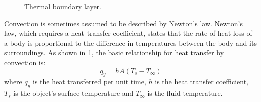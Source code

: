     \begin{figure}[!htp]
        \centering{}
        \caption{Thermal boundary layer.}
        \label{Thermal_boundary_layer}
    \end{figure}

Convection is sometimes assumed to be described by Newton's law.
Newton's law, which requires a heat transfer coefficient, states that the rate of heat loss of a body is proportional to the difference in temperatures between the body and its surroundings. %
As shown in \ref{Thermal_boundary_layer}, the basic relationship for heat transfer by convection is:
    \begin{equation}
    q_y=hA(T_s-T_{\infty})
    \end{equation}
where $q_y$ is the heat transferred per unit time, $h$ is the heat transfer coefficient, $T_s$ is the object's surface temperature and $T_{\infty}$ is the fluid temperature.



